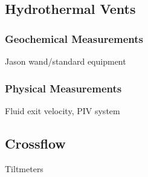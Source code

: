 \subsection{Hydrothermal Vents}

\subsubsection{Geochemical Measurements}
Jason wand/standard equipment

\subsubsection{Physical Measurements}
Fluid exit velocity, PIV system

\subsection{Crossflow}
Tiltmeters
